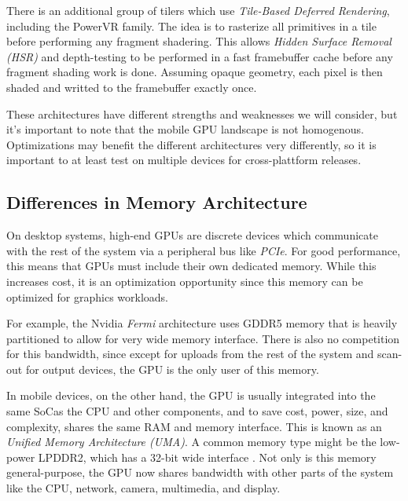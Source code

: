 There is an additional group of tilers which use \textit{Tile-Based Deferred Rendering}, including the PowerVR family.  The idea is to rasterize all primitives in a tile before performing any fragment shadering.  This allows \textit{Hidden Surface Removal (HSR)} and depth-testing to be performed in a fast framebuffer cache before any fragment shading work is done.  Assuming opaque geometry, each pixel is then shaded and writted to the framebuffer exactly once.

These architectures have different strengths and weaknesses we will consider, but it's important to note that the mobile GPU landscape is not homogenous.  Optimizations may benefit the different architectures very differently, so it is important to at least test on multiple devices for cross-plattform releases.
\subsection{Differences in Memory Architecture}\label{Jon-McCaffrey:differences-in-memory-architecture}

On desktop systems, high-end GPUs are discrete devices which communicate with the rest of the system via a peripheral bus like \textit{PCIe}.  For good performance, this means that GPUs must include their own dedicated memory.  While this increases cost, it is an optimization opportunity since this memory can be optimized for graphics workloads.

For example, the Nvidia \textit{Fermi} architecture uses GDDR5 memory that is heavily partitioned \cite{Walton10} to allow for very wide memory interface.  There is also no competition for this bandwidth, since except for uploads from the rest of the system and scan-out for output devices, the GPU is the only user of this memory.


In mobile devices, on the other hand, the GPU is usually integrated into the same SoCas the CPU and other components, and to save cost, power, size, and complexity, shares the same RAM and memory interface.  This is known as an \textit{Unified Memory Architecture (UMA)}.  A common memory type might be the low-power LPDDR2, which has a 32-bit wide interface \cite{anandtech_lg_optimus}.  Not only is this memory general-purpose, the GPU now shares bandwidth with other parts of the system like the CPU, network, camera, multimedia, and display.   

